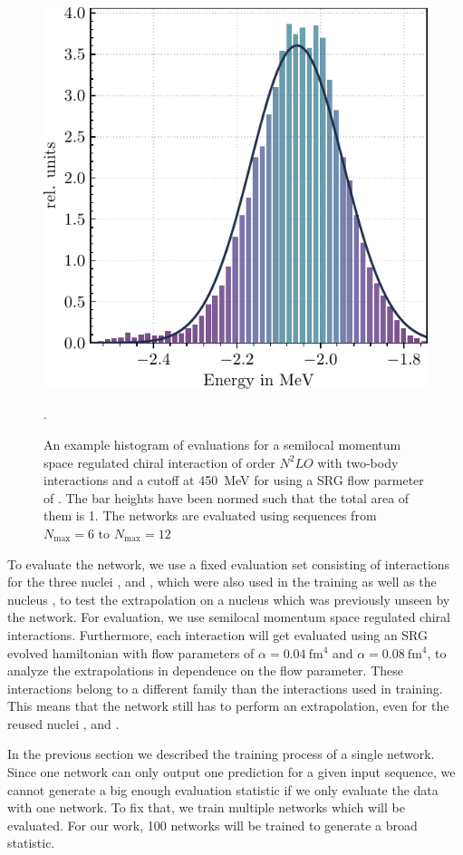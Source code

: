 \begin{figure}
  \centering
  \includegraphics[width=.5\textwidth]{media/example_histogram.pdf}
  \caption{An example histogram of evaluations for a semilocal momentum space regulated chiral interaction of order $N^{2}LO$ with two-body interactions and a cutoff at \SI{450}{\mega\electronvolt} for  using a SRG flow parmeter of . The bar heights have been normed such that the total area of them is 1. The networks are evaluated using sequences from $N_\mathrm{max}=6$ to $N_\mathrm{max}=12$}.
  \label{fig:example_histogram}
\end{figure}
To evaluate the network, we use a fixed evaluation set consisting of interactions for the three nuclei ,  and , which were also used in the training as well as the nucleus , to test the extrapolation on a nucleus which was previously unseen by the network. For evaluation, we use semilocal momentum space regulated chiral interactions. Furthermore, each interaction will get evaluated using an SRG evolved hamiltonian with flow parameters of $\alpha = \SI{0.04}{\femto\metre^4}$ and $\alpha = \SI{0.08}{\femto\metre^4}$, to analyze the extrapolations in dependence on the flow parameter. These interactions belong to a different family than the interactions used in training. This means that the network still has to perform an extrapolation, even for the reused nuclei ,  and .


In the previous section we described the training process of a single network. Since one network can only output one prediction for a given input sequence, we cannot generate a big enough evaluation statistic if we only evaluate the data with one network. To fix that, we train multiple networks which will be evaluated. For our work, 100 networks will be trained to generate a broad statistic.


